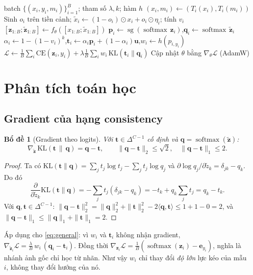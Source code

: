\documentclass[11pt,a4paper]{article}
\theoremstyle{plain}
\newtheorem{lemma}[proposition]{Bổ đề}
\theoremstyle{definition}
\theoremstyle{remark}
\newcommand{\Simplex}{\Delta^{C-1}}
\newcommand{\KL}{\mathrm{KL}}
\newcommand{\CE}{\mathrm{CE}}
\newcommand{\sg}{\operatorname{sg}}
\newcommand{\softmax}{\operatorname{softmax}}
\newcommand{\bp}{\bm{p}}
\newcommand{\bq}{\bm{q}}
\newcommand{\bt}{\bm{t}}
\newcommand{\bu}{\bm{u}}
\newcommand{\bz}{\bm{z}}
\newcommand{\be}{\bm{e}}
\newcommand{\xt}{\tilde{x}}
\newcommand{\zt}{\tilde{\bz}}
\begin{document}
\begin{algorithm}[t]
\caption{Một bước huấn luyện VCC}
\label{alg:vcc}
\begin{algorithmic}[1]
\Require batch $\{(x_i,y_i,m_i)\}_{i=1}^B$; tham số $\lambda,k$; hàm $h$
  \State $(x_i,m_i)\gets(T_i(x_i),T_i(m_i))$ 
  \State Sinh $o_i$ trên tiền cảnh; $\xt_i\gets(1-o_i)\odot x_i+o_i\odot\eta_i$; tính $v_i$
\EndFor
\State $[\bz_{1:B};\zt_{1:B}]\gets f_\theta([x_{1:B};\xt_{1:B}])$ 
\State $\bp_i\gets\sg(\softmax\,\bz_i)$,\quad $\bq_i\gets\softmax\,\zt_i$
\State $\alpha_i\gets1-(1-v_i)^k$,\quad $\bt_i\gets\alpha_i\bp_i+(1-\alpha_i)\bu$,\quad $w_i\gets h(p_{i,y_i})$
\State $\mathcal{L}\gets\frac{1}{B}\sum_i\CE(\bz_i,y_i)+\lambda\frac{1}{B}\sum_i w_i\,\KL(\bt_i\|\bq_i)$
\State Cập nhật $\theta$ bằng $\nabla_\theta\mathcal{L}$ (AdamW)
\end{algorithmic}
\end{algorithm}

\section{Phân tích toán học}
\label{sec:theory}

\subsection{Gradient của hạng consistency}

\begin{lemma}[Gradient theo logits]
\label{lem:grad}
Với $\bt\in\Simplex$ cố định và $\bq=\softmax(\zt)$:
\[
  \nabla_{\zt}\,\KL(\bt\,\|\,\bq) = \bq-\bt,
  \qquad \|\bq-\bt\|_2\le\sqrt2,\quad \|\bq-\bt\|_1\le 2 .
\]
\end{lemma}
\begin{proof}
Ta có $\KL(\bt\|\bq)=\sum_j t_j\log t_j-\sum_j t_j\log q_j$ và $\partial\log q_j/\partial\tilde z_k=\delta_{jk}-q_k$. Do đó
\[
  \frac{\partial}{\partial\tilde z_k}\KL(\bt\|\bq)=-\sum_j t_j(\delta_{jk}-q_k)=-t_k+q_k\sum_j t_j=q_k-t_k .
\]
Với $\bq,\bt\in\Simplex$: $\|\bq-\bt\|_2^2=\|\bq\|_2^2+\|\bt\|_2^2-2\langle\bq,\bt\rangle\le1+1-0=2$, và $\|\bq-\bt\|_1\le\|\bq\|_1+\|\bt\|_1=2$.
\end{proof}

Áp dụng cho \eqref{eq:general}: vì $w_i$ và $\bt_i$ không nhận gradient, $\nabla_{\zt_i}\mathcal{L}=\tfrac{\lambda}{B}\,w_i\,(\bq_i-\bt_i)$. Đồng thời $\nabla_{\bz_i}\mathcal{L}=\tfrac1B(\softmax(\bz_i)-\be_{y_i})$, nghĩa là nhánh ảnh gốc chỉ học từ nhãn. Như vậy $w_i$ chỉ thay đổi \emph{độ lớn} lực kéo của mẫu $i$, không thay đổi hướng của nó.
\end{document}
